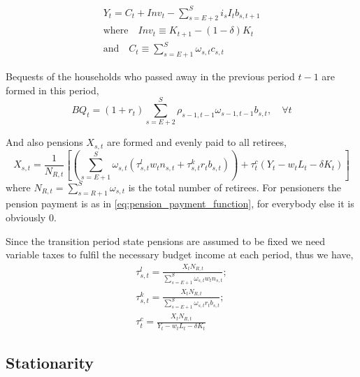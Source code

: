\begin{equation}\label{eq:clearing_prod_function}
    \begin{aligned}
      Y_t = C_t + Inv_t - \sum_{s=E+2}^{S} i_s I_t b_{s,t+1}
      \\
      \text{where} \quad Inv_t \equiv K_{t+1} - (1 - \delta) K_t
      \\
      \text{and} \quad C_t \equiv \sum_{s=E+1}^{S} \omega_{s,t} c_{s,t}
    \end{aligned}
\end{equation}

Bequests of the households who passed away in the previous period $t-1$ are formed in this period,
\begin{equation}\label{eq:bequests_function}
    BQ_t = (1+r_t) \sum^S_{s=E+2}\rho_{s-1, t-1}\omega_{s-1,t-1}b_{s,t}, \quad \forall t
\end{equation}

And also pensions $X_{s,t}$ are formed and evenly paid to all retirees,
\begin{equation}\label{eq:pension_payment_function}
    X_{s,t} = \frac{1}{N_{R, t}} \left[ \left( \sum^S_{s=E+1}  \omega_{s,t} (\tau^l_{s,t} w_t n_{s,t} + \tau^k_{s,t} r_t b_{s,t}) \right) + \tau^c_t(Y_t - w_t L_t - \delta K_t) \right]
\end{equation}
where $N_{R,t} = \sum^S_{s=R+1}\omega_{s,t}$ is the total number of retirees. For pensioners the pension payment is as in \textcolor{Fuchsia}{\eqref{eq:pension_payment_function}}, for everybody else it is obviously $0$.

Since the transition period state pensions are assumed to be fixed we need variable taxes to fulfil the necessary budget income at each period, thus we have,
\begin{equation}\label{eq:tax_rates_functions}
    \begin{aligned}
        \tau^l_{s,t}=\frac{X_t N_{R,t}}{\sum^S_{s=E+1}\omega_{s,t} w_t n_{s,t}}; \\
        \tau^k_{s,t} = \frac{X_t N_{R,t}}{\sum^S_{s=E+1}\omega_{s,t} r_t b_{s,t}}; \\
        \tau^c_{t} = \frac{X_t N_{R,t}}{Y_t - w_t L_t - \delta K_t}
    \end{aligned}
\end{equation}



\subsection{Stationarity}
\label{subsec:stat}

